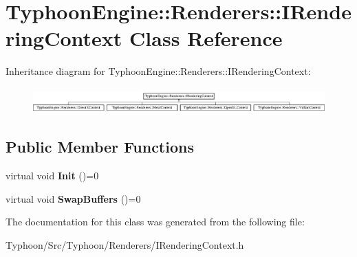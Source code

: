 \hypertarget{class_typhoon_engine_1_1_renderers_1_1_i_rendering_context}{}\section{Typhoon\+Engine\+::Renderers\+::I\+Rendering\+Context Class Reference}
\label{class_typhoon_engine_1_1_renderers_1_1_i_rendering_context}
Inheritance diagram for Typhoon\+Engine\+::Renderers\+::I\+Rendering\+Context\+:\begin{figure}[H]
\begin{center}
\leavevmode
\includegraphics[height=0.992908cm]{class_typhoon_engine_1_1_renderers_1_1_i_rendering_context}
\end{center}
\end{figure}
\subsection*{Public Member Functions}
\begin{DoxyCompactItemize}
\item 
\mbox{\label{class_typhoon_engine_1_1_renderers_1_1_i_rendering_context_aa6c4c5d7c4d39fa83e88f6b5da4f2c1f}} 
virtual void {\bfseries Init} ()=0
\item 
\mbox{\label{class_typhoon_engine_1_1_renderers_1_1_i_rendering_context_aff20f86fcec590e430e12ad43aa24153}} 
virtual void {\bfseries Swap\+Buffers} ()=0
\end{DoxyCompactItemize}


The documentation for this class was generated from the following file\+:\begin{DoxyCompactItemize}
\item 
Typhoon/\+Src/\+Typhoon/\+Renderers/I\+Rendering\+Context.\+h\end{DoxyCompactItemize}
